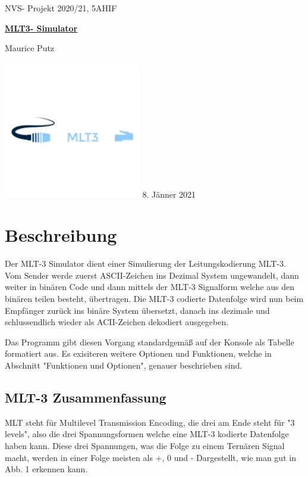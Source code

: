 \documentclass{article}
\begin{document}
\begin{titlepage}
    \centering
NVS- Projekt 2020/21, 5AHIF

\vskip4cm
    {\bfseries\Large
        \huge\underline{MLT3- Simulator}

	Maurice Putz\\
    }
    \includegraphics[width=6cm]{mlt3logo.png} %
    \vskip6cm
 8. Jänner 2021\\
\end{titlepage}

\newpage
\tableofcontents
\newpage
{}

\section{Beschreibung}

Der MLT-3 Simulator dient einer Simulierung der Leitungskodierung MLT-3. Vom Sender werde zuerst ASCII-Zeichen 
ins Dezimal System ungewandelt, dann weiter in binären Code und dann mittels der MLT-3 Signalform welche aus
den binären teilen besteht, übertragen. Die MLT-3 codierte Datenfolge wird nun beim Empfänger zurück ins binäre System
übersetzt, danach ins dezimale und schlussendlich wieder als ACII-Zeichen dekodiert ausgegeben.

Das Programm gibt diesen Vorgang standardgemäß auf der Konsole als Tabelle formatiert aus. Es exisiteren weitere
Optionen und Funktionen, welche in Abschnitt "Funktionen und Optionen", genauer beschrieben sind.

\subsection{MLT-3 Zusammenfassung}

MLT steht für Multilevel Transmission Encoding, die drei am Ende steht für "3 levels", also die drei Spannungsformen welche eine
MLT-3 kodierte Datenfolge haben kann. Diese drei Spannungen, was die Folge zu einem Ternären Signal macht,
werden in einer Folge meisten als +, 0 und - Dargestellt, wie man gut in Abb. 1 erkennen kann.
\end{document}
